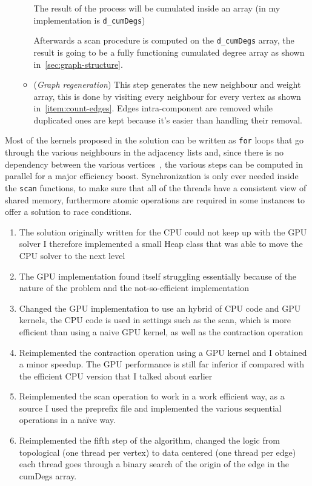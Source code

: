 \documentclass[a4paper,10pt]{article}
\begin{document}
\begin{enumerate}
\begin{itemize}
				The result of the process will be cumulated inside an array (in my
				implementation is \texttt{d\_cumDegs})

				Afterwards a scan procedure is computed on the \texttt{d\_cumDegs}
				array, the result is going to be a fully functioning cumulated
				degree array as shown in~\ref{sec:graph-structure}.
			\item\label{item:graph-regen} (\textit{Graph regeneration}) This step
				generates the new neighbour and weight array, this is done by
				visiting every neighbour for every vertex as shown in~\ref{item:count-edges}. Edges intra-component are removed while duplicated ones are kept because it's easier than handling their removal.
		\end{itemize}
\end{enumerate}
Most of the kernels proposed in the solution can be written as \texttt{for} loops that go through
the various neighbours in the adjacency lists and, since there is no dependency between the various vertices~\cite{generic-he-boruvka}, the various steps can be computed in parallel for a major efficiency boost. Synchronization is only ever needed inside the \texttt{scan} functions, to make sure that all of the threads have a consistent view of shared memory, furthermore atomic operations are required in some instances to offer a solution to race conditions.

\begin{enumerate}
	\item The solution originally written for the CPU could not keep up with the GPU solver I therefore implemented a small Heap class that was able to move the CPU solver to the next level
	\item The GPU implementation found itself struggling essentially because of the nature of the problem and the not-so-efficient implementation
	\item Changed the GPU implementation to use an hybrid of CPU code and GPU kernels, the CPU code is used in settings such as the scan, which is more efficient than using a naive GPU kernel, as well as the contraction operation
	\item Reimplemented the contraction operation using a GPU kernel and I obtained a minor speedup. The GPU performance is still far inferior if compared with the efficient CPU version that I talked about earlier
	\item Reimplemented the scan operation to work in a work efficient way, as a source I used the preprefix file and implemented the various sequential operations in a naïve way.
	\item Reimplemented the fifth step of the algorithm, changed the logic from topological (one thread per vertex) to data centered (one thread per edge) each thread goes through a binary search of the origin of the edge in the cumDegs array.
\end{enumerate}
\end{document}
